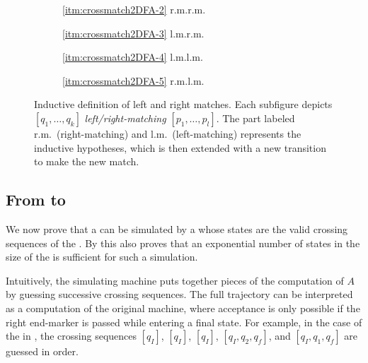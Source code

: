 \begin{figure}
	\centering
	\begin{subfigure}{0.246\textwidth}
		\centering
		
		\caption*{\ref{itm:crossmatch2DFA-2} r.m.\tto r.m.}
	\end{subfigure}
	\hfill
	\begin{subfigure}{0.242\textwidth}
		\centering
		
		\caption*{\ref{itm:crossmatch2DFA-3} l.m.\tto r.m.}
	\end{subfigure}
	\hfill
	\begin{subfigure}{0.242\textwidth}
		\centering
		
		\caption*{\ref{itm:crossmatch2DFA-4} l.m.\tto l.m.}
	\end{subfigure}
	\hfill
	\begin{subfigure}{0.246\textwidth}
		\centering
		
		\caption*{\ref{itm:crossmatch2DFA-5} r.m.\tto l.m.}
	\end{subfigure}
	\caption{Inductive definition of left and right matches. Each subfigure depicts $[q_1,\dots,q_k]$ \emph{left/right-matching} $[p_1,\dots,p_l]$. The part labeled r.m.\ (right-matching) and l.m.\ (left-matching) represents the inductive hypotheses, which is then extended with a new transition to make the new match.}
	\label{fig:2DFA-crossmatch}
\end{figure}


\subsection{From \TDFAs to \ONFAs}
We now prove that a \TDFA can be simulated by a \ONFA whose states are the valid crossing sequences of the \TDFA.
By  this also proves that an exponential number of states in the size of the \TDFA is sufficient for such a simulation.

Intuitively, the simulating machine puts together pieces of the computation of $A$ by guessing successive crossing sequences.
The full trajectory can be interpreted as a computation of the original machine, where acceptance is only possible if the right end-marker is passed while entering a final state.
For example, in the case of the \TDFA in , the crossing sequences $[q_I]$, $[q_I]$, $[q_I]$, $[q_I,q_2,q_f]$, and $[q_I,q_1,q_f]$ are guessed in order.

